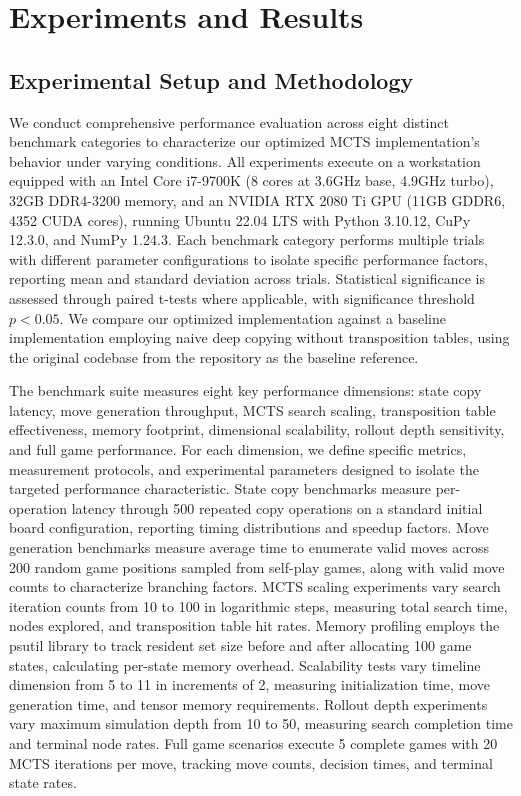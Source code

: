 \documentclass{article}
\begin{document}
\section{Experiments and Results}

\subsection{Experimental Setup and Methodology}

We conduct comprehensive performance evaluation across eight distinct benchmark categories to characterize our optimized MCTS implementation's behavior under varying conditions. All experiments execute on a workstation equipped with an Intel Core i7-9700K (8 cores at 3.6GHz base, 4.9GHz turbo), 32GB DDR4-3200 memory, and an NVIDIA RTX 2080 Ti GPU (11GB GDDR6, 4352 CUDA cores), running Ubuntu 22.04 LTS with Python 3.10.12, CuPy 12.3.0, and NumPy 1.24.3. Each benchmark category performs multiple trials with different parameter configurations to isolate specific performance factors, reporting mean and standard deviation across trials. Statistical significance is assessed through paired t-tests where applicable, with significance threshold $p < 0.05$. We compare our optimized implementation against a baseline implementation employing naive deep copying without transposition tables, using the original codebase from the repository as the baseline reference.

The benchmark suite measures eight key performance dimensions: state copy latency, move generation throughput, MCTS search scaling, transposition table effectiveness, memory footprint, dimensional scalability, rollout depth sensitivity, and full game performance. For each dimension, we define specific metrics, measurement protocols, and experimental parameters designed to isolate the targeted performance characteristic. State copy benchmarks measure per-operation latency through 500 repeated copy operations on a standard initial board configuration, reporting timing distributions and speedup factors. Move generation benchmarks measure average time to enumerate valid moves across 200 random game positions sampled from self-play games, along with valid move counts to characterize branching factors. MCTS scaling experiments vary search iteration counts from 10 to 100 in logarithmic steps, measuring total search time, nodes explored, and transposition table hit rates. Memory profiling employs the psutil library to track resident set size before and after allocating 100 game states, calculating per-state memory overhead. Scalability tests vary timeline dimension from 5 to 11 in increments of 2, measuring initialization time, move generation time, and tensor memory requirements. Rollout depth experiments vary maximum simulation depth from 10 to 50, measuring search completion time and terminal node rates. Full game scenarios execute 5 complete games with 20 MCTS iterations per move, tracking move counts, decision times, and terminal state rates.
\end{document}
